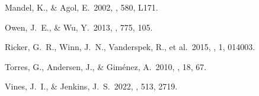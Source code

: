\begin{thebibliography}{}
  Mandel, K., \& Agol, E.\ 2002,
  \apjl, 580, L171.

  Owen, J.~E., \& Wu, Y.\ 2013,
  \apj, 775, 105.

  Ricker, G.~R., Winn, J.~N., Vanderspek, R., et al.\ 2015,
  \jatis, 1, 014003.

  Torres, G., Andersen, J., \& Gim\'enez, A.\ 2010,
  \aapr, 18, 67.

  Vines, J.~I., \& Jenkins, J.~S.\ 2022,
  \mnras, 513, 2719.

\end{thebibliography}
